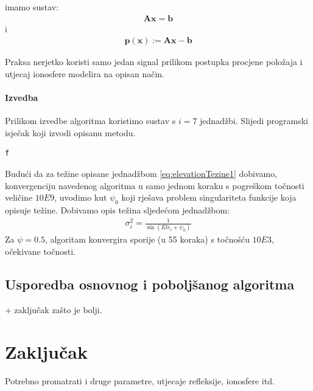 \documentclass[a4paper,twoside,12pt]{memoir} %
\begin{document}
imamo sustav:
\begin{align*}
\mathbf{A}\mathbf{x} = \mathbf{b}
\end{align*} i
\begin{align*}
\mathbf{p}(\mathbf{x}) := \mathbf{A}\mathbf{x} - \mathbf{b}
\end{align*}


Praksa nerjetko koristi samo jedan signal prilikom postupka procjene položaja i utjecaj ionosfere modelira 
na opisan način.

\subsubsection{Izvedba}
Prilikom izvedbe algoritma koristimo sustav s $i = 7$ jednadžbi.
Slijedi programski isječak koji izvodi opisanu metodu.
\begin{lstlisting}[language=R]
f
\end{lstlisting}%
Budući da za težine opisane jednadžbom \ref{eq:elevationTezine1} dobivamo,
konvergenciju navedenog algoritma u samo jednom koraku s pogreškom točnosti veličine $10E9$,
uvodimo kut $\psi_0$ koji rješava problem singulariteta funkcije koja opisuje težine.
Dobivamo opis težina sljedećom jednadžbom:
\begin{align}\label{eq:elevationTezine2}
\sigma^2_i = \frac{1}{ \sin ( Ele_i + \psi_0) }
\end{align}
Za $\psi = 0.5$, algoritam konvergira sporije (u 55 koraka) s točnošću $10E3$, očekivane točnosti.


\section{Usporedba osnovnog i poboljšanog algoritma} + zaključak zašto je bolji.
\chapter{Zaključak}
Potrebno promatrati i druge parametre, utjecaje refleksije, ionosfere itd.



\end{document}
